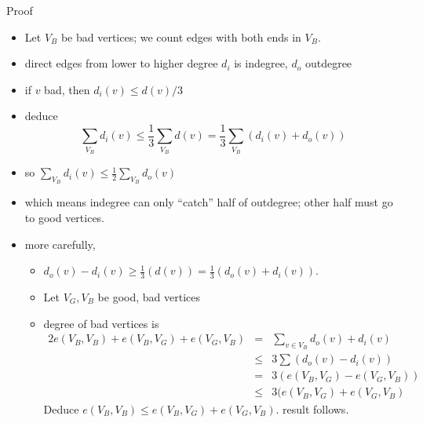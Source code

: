 \documentclass[12pt]{article}
\begin{document}
Proof
\begin{itemize}

\item Let $V_B$ be bad vertices; we count edges with both ends in $V_B$.
\item direct edges from lower to higher degree $d_i$ is indegree,
  $d_o$ outdegree
\item if $v$ bad, then $d_i(v) \le d(v)/3$
\item deduce 
\[\sum_{V_B} d_i(v) \le \frac13 \sum_{V_B}
  d(v)=\frac13\sum_{V_B}( d_i(v)+d_o(v))
\]
\item so $\sum_{V_B} d_i(v) \le \frac12 \sum_{V_B} d_o(v)$
\item which means indegree can only ``catch'' half of outdegree; other
  half must go to good vertices. 
\item 
more carefully, 
\begin{itemize}
\item $d_o(v)-d_i(v) \ge
  \frac13(d(v))=\frac13(d_o(v)+d_i(v))$.  
\item Let $V_G,V_B$ be good, bad vertices
\item degree of bad vertices is 
\begin{eqnarray*}
2e(V_B,V_B)+e(V_B,V_G)+e(V_G,V_B)
&= & \sum_{v\in V_B} d_o(v)+d_i(v)\\
&\le &3\sum(d_o(v)-d_i(v))\\
&= &3(e(V_B,V_G)-e(V_G,V_B))\\
&\le &3(e(V_B,V_G)+e(V_G,V_B)
\end{eqnarray*}
Deduce $e(V_B,V_B) \le e(V_B,V_G)+e(V_G,V_B)$.  result follows.
\end{itemize}
\end{itemize}
\end{document}
